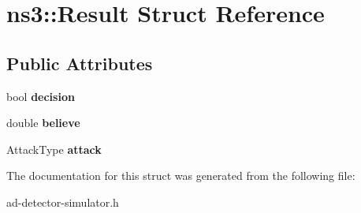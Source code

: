 \hypertarget{structns3_1_1Result}{}\section{ns3\+:\+:Result Struct Reference}
\label{structns3_1_1Result}
\subsection*{Public Attributes}
\begin{DoxyCompactItemize}
\item 
\hypertarget{structns3_1_1Result_a28a2cd9bc91b652e3e91365bcde4cece}{}bool {\bfseries decision}\label{structns3_1_1Result_a28a2cd9bc91b652e3e91365bcde4cece}

\item 
\hypertarget{structns3_1_1Result_ac63824fdff365c8af4f1743dbf378292}{}double {\bfseries believe}\label{structns3_1_1Result_ac63824fdff365c8af4f1743dbf378292}

\item 
\hypertarget{structns3_1_1Result_a6072479933a4562df77ae627df941c3d}{}Attack\+Type {\bfseries attack}\label{structns3_1_1Result_a6072479933a4562df77ae627df941c3d}

\end{DoxyCompactItemize}


The documentation for this struct was generated from the following file\+:\begin{DoxyCompactItemize}
\item 
ad-\/detector-\/simulator.\+h\end{DoxyCompactItemize}
